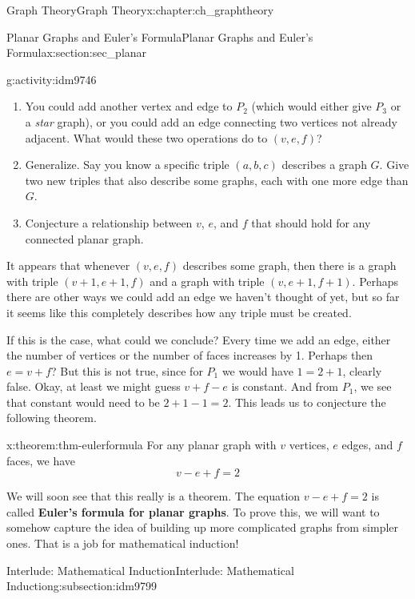 \documentclass[oneside,10pt,]{book}
\newcommand{\terminology}[1]{\textbf{#1}}
\numberwithin{equation}{chapter}
\begin{document}
\begin{chapterptx}{Graph Theory}{}{Graph Theory}{}{}{x:chapter:ch_graphtheory}
\begin{sectionptx}{Planar Graphs and Euler's Formula}{}{Planar Graphs and Euler's Formula}{}{}{x:section:sec_planar}
\begin{introduction}{}
\begin{activity}{}{g:activity:idm9746}
\begin{enumerate}[font=\bfseries,label=(\alph*),ref=\alph*]
\item{}You could add another vertex and edge to \(P_2\) (which would either give \(P_3\) or a \emph{star} graph), or you could add an edge connecting two vertices not already adjacent.  What would these two operations do to \((v,e,f)\)?%
\item{}Generalize.  Say you know a specific triple \((a,b,c)\) describes a graph \(G\).  Give two new triples that also describe some graphs, each with one more edge than \(G\).%
\item{}Conjecture a relationship between \(v\), \(e\), and \(f\) that should hold for any connected planar graph.%
\end{enumerate}
\end{activity}
It appears that whenever \((v,e,f)\) describes some graph, then there is a graph with triple \((v+1, e+1, f)\) and a graph with triple \((v,e+1, f+1)\).  Perhaps there are other ways we could add an edge we haven't thought of yet, but so far it seems like this completely describes how any triple must be created.%
\par
If this is the case, what could we conclude?  Every time we add an edge, either the number of vertices or the number of faces increases by 1.  Perhaps then \(e = v + f\)?  But this is not true, since for \(P_1\) we would have \(1 = 2 + 1\), clearly false.  Okay, at least we might guess \(v + f - e\) is constant.  And from \(P_1\), we see that constant would need to be \(2 + 1 - 1 = 2\).  This leads us to conjecture the following theorem.%
\begin{theorem}{}{}{x:theorem:thm-eulerformula}%
For any planar graph with \(v\) vertices, \(e\) edges, and \(f\) faces, we have%
\begin{equation*}
v - e + f = 2
\end{equation*}
%
\end{theorem}
We will soon see that this really is a theorem.  The equation \(v-e+f = 2\) is called \terminology{Euler's formula for planar graphs}.  To prove this, we will want to somehow capture the idea of building up more complicated graphs from simpler ones.  That is a job for mathematical induction!%
\end{introduction}%
%
%
\typeout{************************************************}
\typeout{************************************************}
%
\begin{subsectionptx}{Interlude: Mathematical Induction}{}{Interlude: Mathematical Induction}{}{}{g:subsection:idm9799}

\end{subsectionptx}
\end{sectionptx}
\end{chapterptx}
\end{document}
